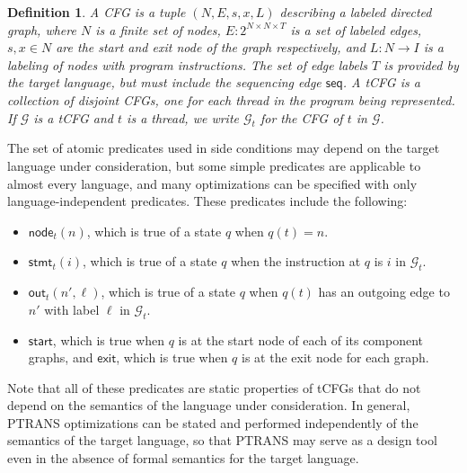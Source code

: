 \documentclass{eptcs}
\newcommand{\ignore}[1]{{}}
\newcommand{\ptrans}[0]{PTRANS}
\newtheorem{definition}{Definition}
\begin{document}
\begin{definition}
A \emph{\ac{CFG}} is a tuple $(N, E, s, x, L)$ describing a labeled directed graph, where $N$ is a finite set of nodes, $E : 2^{N \times N \times T}$ is a set of labeled edges, $s, x \in N$ are the start and exit node of the graph respectively, and $L : N \rightarrow I$ is a labeling of nodes with program instructions.  The set of edge labels $T$ is provided by the target language, but must include the sequencing edge $\mathsf{seq}$. A \emph{\ac{tCFG}} is a collection of disjoint \acp{CFG}, one for each thread in the program being represented.  If $\mathcal{G}$ is a \ac{tCFG} and $t$ is a thread, we write $\mathcal{G}_t$ for the \ac{CFG} of $t$ in $\mathcal{G}$.\end{definition}
\ignore{Here we see a second parameter that must be provided by the target language: a correspondence between instruction labels and outgoing edges. For instance, in most programming languages, an assignment statement should have only one outgoing edge, indicating the next instruction to be executed; a conditional branch statement, on the other hand, should have two outgoing edges, one clearly marked as belonging to each branch. Generalizing this correspondence as a parameter allows us to reason about \acp{CFG} and \acp{tCFG} independently of any particular programming language.}

\label{preds}
The set of atomic predicates used in side conditions may depend on the target language under consideration, but some simple predicates are applicable to almost every language, and many optimizations can be specified with only language-independent predicates. These predicates include the following:
\begin{itemize}
\item $\mathsf{node}_t(n)$, which is true of a state $q$ when $q(t) = n$.
\item $\mathsf{stmt}_t(i)$, which is true of a state $q$ when the instruction at $q$ is $i$ in $\mathcal{G}_t$.
\item $\mathsf{out}_t(n', \ell)$, which is true of a state $q$ when $q(t)$ has an outgoing edge to $n'$ with label $\ell$ in $\mathcal{G}_t$.
\item $\mathsf{start}$, which is true when $q$ is at the start node of each of its component graphs, and $\mathsf{exit}$, which is true when $q$ is at the exit node for each graph.
\ignore{\item $\mathsf{is}(e_1, e_2)$, which is true when $e_1$ and $e_2$ are arithmetic expressions that can be shown to have the same value (independent of program state).}
\end{itemize}
Note that all of these predicates are static properties of \acp{tCFG} that do not depend on the semantics of the language under consideration. In general, {\ptrans} optimizations can be stated and performed independently of the semantics of the target language, so that {\ptrans} may serve as a design tool even in the absence of formal semantics for the target language.
\end{document}

